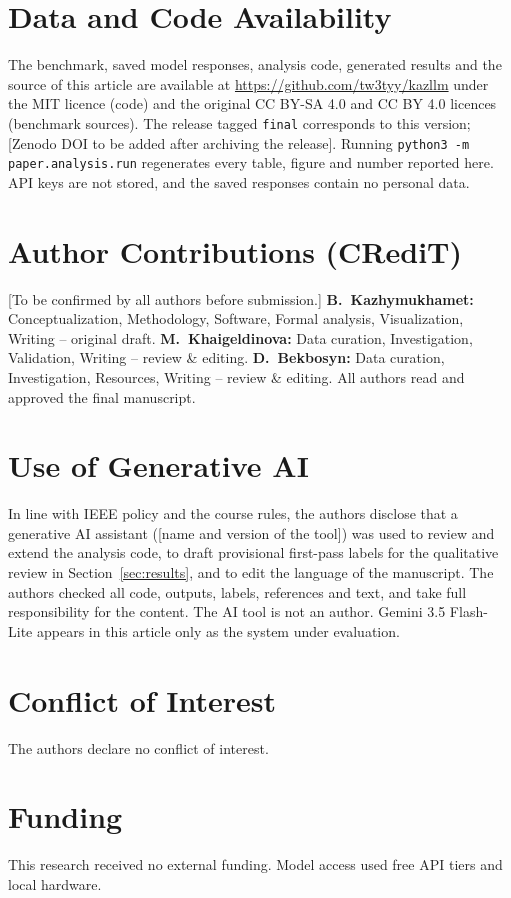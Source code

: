 \section*{Data and Code Availability}
The benchmark, saved model responses, analysis code, generated results and the source of this article are available at \url{https://github.com/tw3tyy/kazllm} under the MIT licence (code) and the original CC BY-SA 4.0 and CC BY 4.0 licences (benchmark sources). The release tagged \texttt{final} corresponds to this version; [Zenodo DOI to be added after archiving the release]. Running \texttt{python3 -m paper.analysis.run} regenerates every table, figure and number reported here. API keys are not stored, and the saved responses contain no personal data.

\section*{Author Contributions (CRediT)}
[To be confirmed by all authors before submission.] \textbf{B.~Kazhymukhamet:} Conceptualization, Methodology, Software, Formal analysis, Visualization, Writing -- original draft. \textbf{M.~Khaigeldinova:} Data curation, Investigation, Validation, Writing -- review \& editing. \textbf{D.~Bekbosyn:} Data curation, Investigation, Resources, Writing -- review \& editing. All authors read and approved the final manuscript.

\section*{Use of Generative AI}
In line with IEEE policy and the course rules, the authors disclose that a generative AI assistant ([name and version of the tool]) was used to review and extend the analysis code, to draft provisional first-pass labels for the qualitative review in Section~\ref{sec:results}, and to edit the language of the manuscript. The authors checked all code, outputs, labels, references and text, and take full responsibility for the content. The AI tool is not an author. Gemini 3.5 Flash-Lite appears in this article only as the system under evaluation.

\section*{Conflict of Interest}
The authors declare no conflict of interest.

\section*{Funding}
This research received no external funding. Model access used free API tiers and local hardware.

